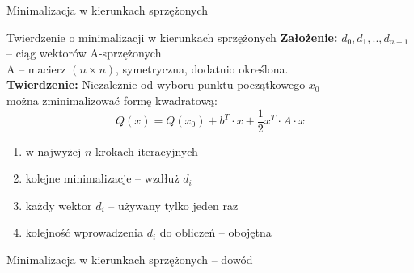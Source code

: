   \begin{frame}{Minimalizacja w kierunkach sprzężonych}
    \begin{block}{Twierdzenie o minimalizacji w kierunkach sprzężonych}
      \textbf{Założenie: } $d_0, d_1, .., d_{n - 1}$ -- ciąg wektorów A-sprzężonych\\
        A -- macierz $(n \times n)$, symetryczna, dodatnio określona.\\
      \textbf{Twierdzenie: } Niezależnie od wyboru punktu początkowego $x_0$\\
       można zminimalizować formę kwadratową:
       \begin{equation}
         Q(x) = Q(x_0) + b^T \cdot x + \frac{1}{2} x^T \cdot A \cdot x
       \end{equation}
       \begin{enumerate}
         \item w najwyżej $n$ krokach iteracyjnych\\
         \item kolejne minimalizacje -- wzdłuż $d_i$\\
         \item każdy wektor $d_i$ -- używany tylko jeden raz\\
         \item kolejność wprowadzenia $d_i$ do obliczeń -- obojętna
       \end{enumerate}
    \end{block}
  \end{frame}

  \begin{frame}{Minimalizacja w kierunkach sprzężonych -- dowód}
  \end{frame}
